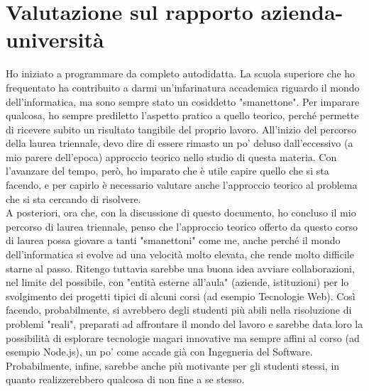 \section{Valutazione sul rapporto azienda-università}
Ho iniziato a programmare da completo autodidatta. La scuola superiore che ho frequentato ha contribuito a darmi un'infarinatura accademica riguardo il mondo dell'informatica, ma sono sempre stato un cosiddetto "smanettone". Per imparare qualcosa, ho sempre prediletto l'aspetto pratico a quello teorico, perché permette di ricevere subito un risultato tangibile del proprio lavoro. All'inizio del percorso della laurea triennale, devo dire di essere rimasto un po' deluso dall'eccessivo (a mio parere dell'epoca) approccio teorico nello studio di questa materia. Con l'avanzare del tempo, però, ho imparato che è utile capire quello che si sta facendo, e per capirlo è necessario valutare anche l'approccio teorico al problema che si sta cercando di risolvere.\\
A posteriori, ora che, con la discussione di questo documento, ho concluso il mio percorso di laurea triennale, penso che l'approccio teorico offerto da questo corso di laurea possa giovare a tanti "smanettoni" come me, anche perché il mondo dell'informatica si evolve ad una velocità molto elevata, che rende molto difficile starne al passo. Ritengo tuttavia sarebbe una buona idea avviare collaborazioni, nel limite del possibile, con "entità esterne all'aula" (aziende, istituzioni) per lo svolgimento dei progetti tipici di alcuni corsi (ad esempio Tecnologie Web). Così facendo, probabilmente, si avrebbero degli studenti più abili nella risoluzione di problemi "reali", preparati ad affrontare il mondo del lavoro e sarebbe data loro la possibilità di esplorare tecnologie magari innovative ma sempre affini al corso (ad esempio Node.js), un po' come accade già con Ingegneria del Software. Probabilmente, infine, sarebbe anche più motivante per gli studenti stessi, in quanto realizzerebbero qualcosa di non fine a se stesso.